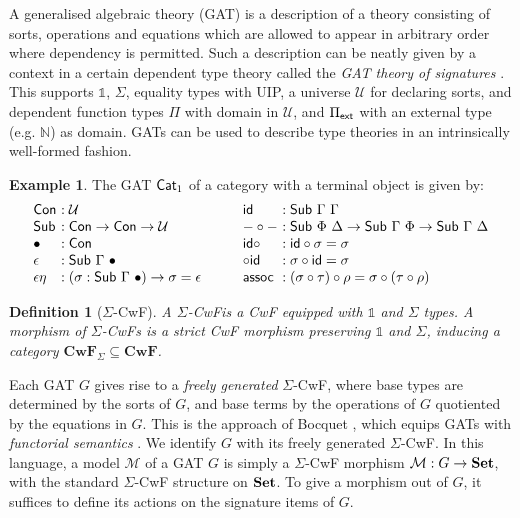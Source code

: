 \documentclass[10pt,a4paper]{article}
\newtheorem{definition}[theorem]{Definition}
\theoremstyle{definition}
\newtheorem{example}[theorem]{Example}
\theoremstyle{remark}
\newcommand{\s}[1]{{\ensuremath{\textsf{\upshape #1}}}\xspace}
\newcommand{\cl}[1]{{\ensuremath{\mathcal{#1}}}\xspace}
\newcommand{\re}[1]{{\ensuremath{\mathbf{#1}}}\xspace}
\newcommand{\std}[1]{\ensuremath{\mathbb{#1}}\xspace}
\newcommand{\mth}[1]{\ensuremath{\textbf{\upshape #1}}\xspace}
\newcommand{\Set}{\mth{Set}}
\newcommand{\univ}{\cl{U}}
\newcommand{\Unit}{\mathbb{1}}
\begin{document}
A generalised algebraic theory (GAT) \cite{Cartmell1986-ig} is a description of
a theory consisting of sorts, operations and equations which are allowed to
appear in arbitrary order where dependency is permitted. Such a description can
be neatly given by a context in a certain dependent type theory called the
\emph{GAT theory of signatures} \cite{Kovacs2023-gq}. This supports $\std 1$,
$\Sigma$, equality types with UIP, a universe $\univ$ for declaring sorts, and
dependent function types $\Pi$ with domain in $\univ$, and $\Pi_\s{ext}$ with an
external type (e.g. $\std N$) as domain. GATs can be used to describe type
theories in an intrinsically well-formed fashion.
\begin{example}\label{ex:cat1}
The GAT $\s{Cat}_1$ of a category with a terminal object is given by:
\[\begin{array}{l@{\ }l}
  \s{Con} &: \univ \\
  \s{Sub} &: \s{Con} \to \s{Con} \to \univ \\
  \bullet &: \s{Con} \\
  \epsilon &: \s{Sub}\ \Gamma\ \bullet \\
  \epsilon\eta &: (\sigma : \s{Sub}\ \Gamma\ \bullet) \to \sigma = \epsilon
\end{array}
\qquad
\begin{array}{l@{\ }l}
  \s{id} &: \s{Sub}\ \Gamma\ \Gamma \\
  -\circ- &: \s{Sub}\ \Phi\ \Delta \to \s{Sub}\ \Gamma\ \Phi \to \s{Sub}\ \Gamma\ \Delta \\
  \s{id}\circ &: \s{id} \circ \sigma = \sigma \\
  \circ\s{id} &: \sigma \circ \s{id} = \sigma \\
  \s{assoc} &: (\sigma \circ \tau) \circ \rho = \sigma \circ (\tau \circ \rho)
\end{array}\]
\end{example}

\begin{definition}[$\Sigma$-CwF]
A \emph{$\Sigma$-CwF}\label{def:sigma-cwf} is a CwF
equipped with $\std 1$ and $\Sigma$ types. A morphism of $\Sigma$-CwFs is a
strict CwF morphism preserving $\Unit$ and $\Sigma$, inducing a category
$\re{CwF}_{\Sigma} \subseteq \re{CwF}$.
\end{definition}

Each GAT $G$ gives rise to a \emph{freely generated} $\Sigma$-CwF, where base
types are determined by the sorts of $G$, and base terms by the operations of
$G$ quotiented by the equations in $G$. This is the approach of Bocquet
\cite{Bocquet2025-ox}, which equips GATs with \emph{functorial semantics}
\cite{Lawvere1963-qd}. We identify $G$ with its freely generated $\Sigma$-CwF.
In this language, a model\label{def:gat-model} $\cl M$ of a GAT $G$ is simply a
$\Sigma$-CwF morphism $\cl M : G \to \Set$, with the standard $\Sigma$-CwF
structure on $\Set$. To give a morphism out of $G$, it suffices to define its
actions on the signature items of $G$.
\end{document}

